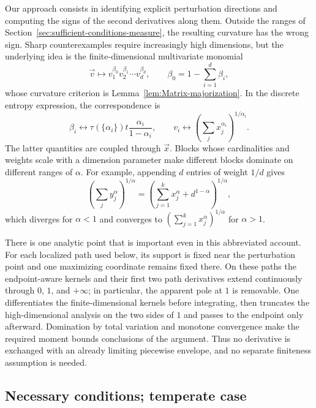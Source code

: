 \documentclass[11pt]{article}
\theoremstyle{definition}
\begin{document}
Our approach consists in identifying explicit perturbation directions and
computing the signs of the second derivatives along them.  Outside the ranges of
Section~\ref{sec:sufficient-conditions-measure}, the resulting curvature has the
wrong sign.  Sharp counterexamples require increasingly high dimensions, but the
underlying idea is the finite-dimensional multivariate monomial
\begin{equation}
\label{eq:multivariate-divergences-function}
\vec{v}\longmapsto v_1^{\beta_0}v_2^{\beta_1}\cdots v_d^{\beta_d},
\qquad \beta_0=1-\sum_{i=1}^d\beta_i,
\end{equation}
whose curvature criterion is Lemma~\ref{lem:Matrix-majorization}.  In the
discrete entropy expression, the correspondence is
\begin{equation}
\beta_i\longleftrightarrow
\tau(\{\alpha_i\})t\frac{\alpha_i}{1-\alpha_i},
\qquad
v_i\longleftrightarrow
\left(\sum_jx_j^{\alpha_i}\right)^{1/\alpha_i}.
\end{equation}
The latter quantities are coupled through $\vec{x}$.  Blocks whose cardinalities
and weights scale with a dimension parameter make different blocks dominate on
different ranges of $\alpha$.  For example, appending $d$ entries of weight
$1/d$ gives
\begin{equation}
\left(\sum_jy_j^\alpha\right)^{1/\alpha}
=\left(\sum_{j=1}^k x_j^\alpha+d^{1-\alpha}\right)^{1/\alpha},
\end{equation}
which diverges for $\alpha<1$ and converges to
$(\sum_{j=1}^k x_j^\alpha)^{1/\alpha}$ for $\alpha>1$.

There is one analytic point that is important even in this abbreviated account.
For each localized path used below, its support is fixed near the perturbation
point and one maximizing coordinate remains fixed there.  On these paths the
endpoint-aware kernels and their first two path derivatives extend continuously
through $0$, $1$, and $+\infty$; in particular, the apparent pole at $1$ is
removable.  One differentiates the finite-dimensional kernels before integrating,
then truncates the high-dimensional analysis on the two sides of $1$ and passes
to the endpoint only afterward.  Domination by total variation and monotone
convergence make the required moment bounds conclusions of the argument.  Thus
no derivative is exchanged with an already limiting piecewise envelope, and no
separate finiteness assumption is needed.

\subsection{Necessary conditions; temperate case}
\end{document}
